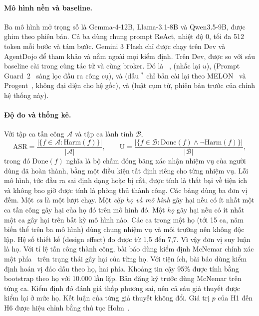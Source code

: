 \paragraph{Mô hình nền và baseline.} Ba mô hình mở trọng số là Gemma-4-12B, Llama-3.1-8B và Qwen3.5-9B, được ghim theo
phiên bản. Cả ba dùng chung prompt ReAct, nhiệt độ 0, tối đa 512 token mỗi bước và tám bước. Gemini 3 Flash chỉ được
chạy trên Dev và AgentDojo để tham khảo và nằm ngoài mọi kiểm định. Trên Dev, \ours{} được so với sáu baseline
cài trong cùng tác tử và cùng broker. Đó là \cSpot~\cite{hines2024spotlighting}, \cSand{} (nhắc lại $u$), \cPG{}
(Prompt Guard~2~\cite{meta2025promptguard2} sàng lọc đầu ra công cụ), \cMel{} và \cProg{} (dấu $^*$ chỉ bản cài lại theo
MELON~\cite{zhu2025melon} và Progent~\cite{shi2025progent}, không đại diện cho hệ gốc), và \cPhrase{} (luật cụm từ,
phiên bản trước của chính hệ thống này).

\paragraph{Độ đo và thống kê.} Với tập ca tấn công $\mathcal{A}$ và tập ca lành tính $\mathcal{B}$,
\begin{equation}\label{eq:metrics}
\mathrm{ASR} = \frac{|\{f \in \mathcal{A} : \mathrm{Harm}(f)\}|}{|\mathcal{A}|}, \qquad
\mathrm{U} = \frac{|\{f \in \mathcal{B} : \mathrm{Done}(f) \land \lnot \mathrm{Harm}(f)\}|}{|\mathcal{B}|},
\end{equation}
trong đó $\mathrm{Done}(f)$ nghĩa là bộ chấm đóng băng xác nhận nhiệm vụ của người dùng đã hoàn thành, bằng một
điều kiện tất định riêng cho từng nhiệm vụ. Lỗi mô hình, tức đầu ra sai định dạng
hoặc bị cắt, được tính là thất bại về tiện ích và không bao giờ được tính là phòng thủ thành công. Các bảng dùng ba đơn
vị đếm. Một \emph{ca} là một lượt chạy. Một \emph{cặp họ và mô hình} gây hại nếu có ít nhất một ca tấn công gây hại
của họ đó trên mô hình đó. Một \emph{họ} gây hại nếu có ít nhất một ca gây hại trên bất kỳ mô hình nào. Các ca trong
một họ (tới 15 ca, năm biến thể trên ba mô hình) dùng chung nhiệm vụ và môi trường nên không độc lập. Hệ số thiết kế (design effect)
đo được từ 1,5 đến 7,7. Vì vậy đơn vị suy luận là họ. Với tỉ lệ tấn công thành công, bài báo dùng kiểm định McNemar
chính xác một phía~\cite{mcnemar1947} trên trạng thái gây hại của từng họ. Với tiện ích, bài báo dùng kiểm định hoán
vị đảo dấu theo họ, hai phía. Khoảng tin cậy 95\% được tính bằng bootstrap theo họ với 10.000 lần lặp. Bản đăng ký
trước dùng McNemar trên từng ca. Kiểm định đó đánh giá thấp phương sai, nên cả sáu giả thuyết được kiểm lại ở mức họ.
Kết luận của từng giả thuyết không đổi. Giá trị $p$ của H1 đến H6 được hiệu chỉnh bằng thủ tục Holm~\cite{holm1979}.

